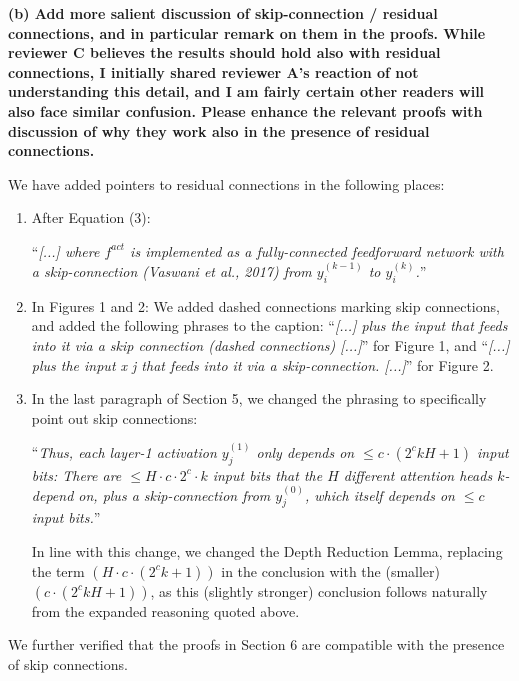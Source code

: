 \documentclass[11pt,a4paper]{article}
\newcommand\response[1]{{\color{blue}#1}}
\newcommand\newtext[1]{``\textit{#1}''}
\newcommand\original[1]{\textbf{#1}}
\begin{document}
\original{(b) Add more salient discussion of skip-connection / residual connections,
and in particular remark on them in the proofs. While reviewer C believes
the results should hold also with residual connections, I initially shared
reviewer A's reaction of not understanding this detail, and I am fairly
certain other readers will also face similar confusion. Please enhance the
relevant proofs with discussion of why they work also in the presence of
residual connections.}

\response{We have added pointers to residual connections in the following places:}


\begin{enumerate}
    \item \response{After Equation (3):}

\response{\newtext{[...] where $f^{act}$ is implemented as a fully-connected feedforward network with a skip-connection (Vaswani et al., 2017) from $y_i^{(k-1)}$ to $y_i^{(k)}$.}}
\newline

\item \response{In Figures 1 and 2: We added dashed connections marking skip connections, and added the following phrases to the caption: \newtext{[...] plus the input that feeds into it via a skip connection (dashed
connections) [...]} for Figure 1, and \newtext{[...] plus the input x j that feeds into it
via a skip-connection. [...]} for Figure 2.}
\newline

\item \response{In the last paragraph of Section 5, we changed the phrasing to specifically point out skip connections:}

\response{\newtext{Thus, each layer-1 activation $y_j^{(1)}$ only depends on $\leq c\cdot (2^ckH+1)$ input bits: There are $\leq H\cdot c \cdot 2^c \cdot k$ input bits that the $H$ different attention heads $k$-depend on, plus a skip-connection from $y_j^{(0)}$, which itself depends on $\leq c$ input bits.}}

\response{In line with this change, we changed the Depth Reduction Lemma, replacing the term $(H\cdot c\cdot(2^ck+1))$ in the conclusion with the (smaller) $( c\cdot(2^ckH+1))$, as this (slightly stronger) conclusion follows naturally from the expanded reasoning quoted above.}
\end{enumerate}


\response{We further verified that the proofs in Section 6 are compatible with the presence of skip connections.}
\end{document}
